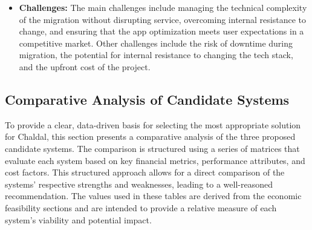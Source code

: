 \documentclass[12pt,a4paper]{article}
\begin{document}
\begin{itemize}
\begin{itemize}
        \item \textbf{Annual Maintenance:}  Projected to reduce IT infrastructure and maintenance costs by 40-50\% annually, saving upwards of 1 Crore BDT per year. Improved app performance is estimated to increase customer retention by 10\%, adding significant long-term value.
        \item \textbf{Projected Savings:} Approximately 1 Crore BDT annually from reduced infrastructure costs and increased customer lifetime value.Android app optimization is expected to reduce churn by 15\%, leading to higher revenue retention.
        \item \textbf{Total Cost of Ownership (TCO):} The shift to a cloud-based infrastructure is expected to lower the total cost of ownership by reducing hardware and maintenance costs while improving scalability and performance.
        \item \textbf{Break-Even:} Less than 1.5 years.
        \item \textbf{Return on Investment (ROI):} Estimated at 180\% within 3 years post-implementation.
    \end{itemize}
    \item \textbf{Challenges:} The main challenges include managing the technical complexity of the migration without disrupting service, overcoming internal resistance to change, and ensuring that the app optimization meets user expectations in a competitive market. Other challenges include the risk of downtime during migration, the potential for internal resistance to changing the tech stack, and the upfront cost of the project.
\end{itemize}

\subsection{Comparative Analysis of Candidate Systems}
To provide a clear, data-driven basis for selecting the most appropriate solution for Chaldal, this section presents a comparative analysis of the three proposed candidate systems. The comparison is structured using a series of matrices that evaluate each system based on key financial metrics, performance attributes, and cost factors. This structured approach allows for a direct comparison of the systems' respective strengths and weaknesses, leading to a well-reasoned recommendation. The values used in these tables are derived from the economic feasibility sections and are intended to provide a relative measure of each system's viability and potential impact.
\end{document}
